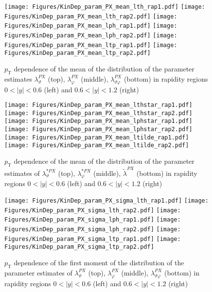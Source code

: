 \documentclass[12pt]{article}
\newcommand{\pT}{p_\mathrm{T}}
\newcommand{\absy}{\left |  y \right |}
\newcommand{\lamthPX}{\lambda^{\scriptscriptstyle PX}_\vartheta}
\newcommand{\lamphPX}{\lambda^{\scriptscriptstyle PX}_\varphi}
\newcommand{\lamthphPX}{\lambda^{\scriptscriptstyle PX}_{\vartheta \varphi}}
\newcommand{\lamtildePX}{\tilde{\lambda}^{\scriptscriptstyle PX}}
\newcommand{\lamthstarPX}{\lambda^{* \scriptscriptstyle PX}_\vartheta}
\newcommand{\lamphstarPX}{\lambda^{* \scriptscriptstyle PX}_\varphi}
\begin{document}



\begin{figure}[htbp]
\centering
\texttt{[image: Figures/KinDep\_param\_PX\_mean\_lth\_rap1.pdf]}
\texttt{[image: Figures/KinDep\_param\_PX\_mean\_lth\_rap2.pdf]}
\texttt{[image: Figures/KinDep\_param\_PX\_mean\_lph\_rap1.pdf]}
\texttt{[image: Figures/KinDep\_param\_PX\_mean\_lph\_rap2.pdf]}
\texttt{[image: Figures/KinDep\_param\_PX\_mean\_ltp\_rap1.pdf]}
\texttt{[image: Figures/KinDep\_param\_PX\_mean\_ltp\_rap2.pdf]}
\caption{$\pT$ dependence of the mean of the distribution of the parameter estimates $\lamthPX$ (top), $\lamphPX$ (middle), $\lamthphPX$ (bottom) in rapidity regions $0<\absy<0.6$ (left) and $0.6<\absy<1.2$ (right)}
\end{figure}
\clearpage

\begin{figure}[htbp]
\centering
\texttt{[image: Figures/KinDep\_param\_PX\_mean\_lthstar\_rap1.pdf]}
\texttt{[image: Figures/KinDep\_param\_PX\_mean\_lthstar\_rap2.pdf]}
\texttt{[image: Figures/KinDep\_param\_PX\_mean\_lphstar\_rap1.pdf]}
\texttt{[image: Figures/KinDep\_param\_PX\_mean\_lphstar\_rap2.pdf]}
\texttt{[image: Figures/KinDep\_param\_PX\_mean\_ltilde\_rap1.pdf]}
\texttt{[image: Figures/KinDep\_param\_PX\_mean\_ltilde\_rap2.pdf]}
\caption{$\pT$ dependence of the mean of the distribution of the parameter estimates of $\lamthstarPX$ (top), $\lamphstarPX$ (middle), $\lamtildePX$ (bottom) in rapidity regions $0<\absy<0.6$ (left) and $0.6<\absy<1.2$ (right)}
\end{figure}
\clearpage


\begin{figure}[htbp]
\centering
\texttt{[image: Figures/KinDep\_param\_PX\_sigma\_lth\_rap1.pdf]}
\texttt{[image: Figures/KinDep\_param\_PX\_sigma\_lth\_rap2.pdf]}
\texttt{[image: Figures/KinDep\_param\_PX\_sigma\_lph\_rap1.pdf]}
\texttt{[image: Figures/KinDep\_param\_PX\_sigma\_lph\_rap2.pdf]}
\texttt{[image: Figures/KinDep\_param\_PX\_sigma\_ltp\_rap1.pdf]}
\texttt{[image: Figures/KinDep\_param\_PX\_sigma\_ltp\_rap2.pdf]}
\caption{$\pT$ dependence of the first moment of the distribution of the parameter estimates of $\lamthPX$ (top), $\lamphPX$ (middle), $\lamthphPX$ (bottom) in rapidity regions $0<\absy<0.6$ (left) and $0.6<\absy<1.2$ (right)}
\end{figure}
\clearpage
\end{document}
